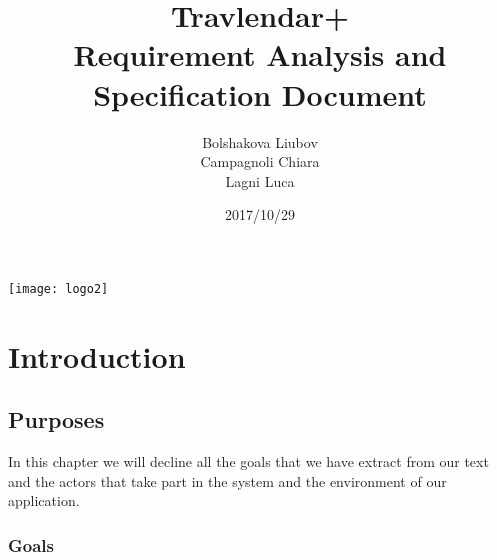 \documentclass[a4paper,leqno]{book}
\begin{document}
	


\date{2017/10/29}
\author{Bolshakova Liubov\\ Campagnoli Chiara\\ Lagni Luca}
\title{\textbf{\huge Travlendar+}\\ Requirement Analysis and Specification Document}
\frontmatter                            %
\begin{minipage}[!t]{\linewidth}
	\centering
	\texttt{[image: logo2]}
\end{minipage}
\begin{minipage}[!h]{\linewidth}
	\maketitle 
\end{minipage}
\tableofcontents                        %
\mainmatter   

\chapter{Introduction}

\section{Purposes}
In this chapter we will decline all the goals that we have extract from our text and the actors that take part in the system and the environment of our application.

\subsection{Goals}
\end{document}
